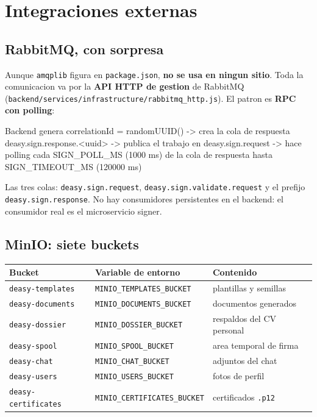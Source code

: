 \documentclass[11pt,a4paper,oneside]{report}
\newcommand{\rt}[1]{\texttt{#1}}
\begin{document}
\section{Integraciones externas}

\subsection{RabbitMQ, con sorpresa}

Aunque \rt{amqplib} figura en \rt{package.json}, \textbf{no se usa en ningun sitio}. Toda la
comunicacion va por la \textbf{API HTTP de gestion} de RabbitMQ
(\rt{backend/services/infrastructure/rabbitmq\_http.js}). El patron es \textbf{RPC con
polling}:

\begin{diagrama}
Backend genera correlationId = randomUUID()
  -> crea la cola de respuesta   deasy.sign.response.<uuid>
  -> publica el trabajo en       deasy.sign.request
  -> hace polling cada SIGN_POLL_MS (1000 ms) de la cola de respuesta
     hasta SIGN_TIMEOUT_MS (120000 ms)
\end{diagrama}

Las tres colas: \rt{deasy.sign.request}, \rt{deasy.sign.validate.request} y el prefijo
\rt{deasy.sign.response}. No hay consumidores persistentes en el backend: el consumidor real es
el microservicio signer.

\subsection{MinIO: siete buckets}

\begin{center}
\footnotesize
\begin{tabularx}{\textwidth}{@{}P{4.0cm}P{5.2cm}L@{}}
\toprule
\textbf{Bucket} & \textbf{Variable de entorno} & \textbf{Contenido} \\
\midrule
\rt{deasy-templates}    & \rt{MINIO\_TEMPLATES\_BUCKET}    & plantillas y semillas \\
\rt{deasy-documents}    & \rt{MINIO\_DOCUMENTS\_BUCKET}    & documentos generados \\
\rt{deasy-dossier}      & \rt{MINIO\_DOSSIER\_BUCKET}      & respaldos del CV personal \\
\rt{deasy-spool}        & \rt{MINIO\_SPOOL\_BUCKET}        & area temporal de firma \\
\rt{deasy-chat}         & \rt{MINIO\_CHAT\_BUCKET}         & adjuntos del chat \\
\rt{deasy-users}        & \rt{MINIO\_USERS\_BUCKET}        & fotos de perfil \\
\rt{deasy-certificates} & \rt{MINIO\_CERTIFICATES\_BUCKET} & certificados \rt{.p12} \\
\bottomrule
\end{tabularx}
\end{center}
\end{document}
